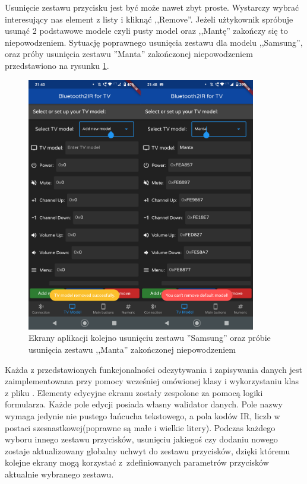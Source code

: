 \documentclass[12pt,twoside]{article}
\begin{document}
Usunięcie zestawu przycisku jest być może nawet zbyt proste. Wystarczy wybrać interesujący nas element z listy i kliknąć ,,Remove''. Jeżeli użtykownik spróbuje usunąć 2 podstawowe modele czyli pusty model oraz ,,Mantę'' zakończy się to niepowodzeniem. Sytuację poprawnego usunięcia zestawu dla modelu ,,Samsung'', oraz próby usunięcia zestawu ''Manta'' zakończonej niepowodzeniem przedstawiono na rysunku \ref*{Fig:removingSamsung}.

\begin{figure}[ht]
   \centering
   \includegraphics[width=10cm]{images/removingSamsung.png}
   \caption{Ekrany aplikacji kolejno usunięciu zestawu ''Samsung'' oraz próbie usunięcia zestawu ,,Manta'' zakończonej niepowodzeniem}
   \label{Fig:removingSamsung}
\end{figure}

Każda z przedstawionych funkcjonalności odczytywania i zapisywania danych jest zaimplementowana przy pomocy wcześniej omówionej klasy  i wykorzystaniu klas z pliku . Elementy edycyjne ekranu zostały zespolone za pomocą logiki formularza. Każde pole edycji posiada własny walidator danych. Pole nazwy wymaga jedynie nie pustego łańcucha tekstowego, a pola kodów IR, liczb w postaci szesnastkowej(poprawne są małe i wielkie litery). Podczas każdego wyboru innego zestawu przycisków, usunięciu jakiegoś czy dodaniu nowego zostaje aktualizowany globalny uchwyt do zestawu przycisków, dzięki któremu kolejne ekrany mogą korzystać z~zdefiniowanych parametrów przycisków aktualnie wybranego zestawu.
\end{document}
